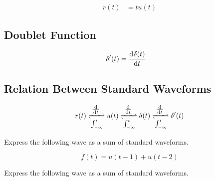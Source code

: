 \documentclass[fleqn, a4paper, 12pt, twoside]{article}
\theoremstyle{definition}
\theoremstyle{theorem}
\begin{document}
\begin{align*}
	r(t) &= t u(t)
\end{align*}

\subsection{Doublet Function}

\begin{align*}
	\delta' (t) &= \dod{\delta(t)}{t}
\end{align*}

\subsection{Relation Between Standard Waveforms}

\begin{equation*}
	r(t) \xrightleftharpoons[\int_{-\infty}^{t}]{\od{}{t}} u(t) \xrightleftharpoons[\int_{-\infty}^{t}]{\od{}{t}} \delta(t) \xrightleftharpoons[\int_{-\infty}^{t}]{\od{}{t}} \delta' (t) 
\end{equation*}

\begin{question}
	Express the following wave as a sum of standard waveforms.
	\begin{figure}[H]
	\end{figure}
\end{question}

\begin{solution}
	\begin{equation*}
		f(t) = u(t - 1) + u(t - 2)
	\end{equation*}
\end{solution}

\begin{question}
	Express the following wave as a sum of standard waveforms.
	\begin{figure}[H]
	\end{figure}
\end{question}
\end{document}
